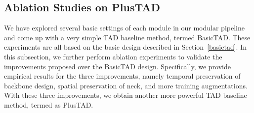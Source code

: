 \documentclass[a4paper,fleqn]{cas-dc}
\begin{document}
\begin{table*}[t]
\centering
\small
\caption{\textbf{Ablation study on improvements of PlusTAD on THUMOS14~\citep{THUMOS14}}. Temporal Preservation is for backbone design (indicated as ``TP''), and Spatial Preservation is for neck design (indicated as ``SP''). }
\label{table:xx}
\setlength{}
\end{table*}

\subsection{Ablation Studies on PlusTAD}
We have explored several basic settings of each module in our modular pipeline and come up with a very simple TAD baseline method, termed BasicTAD.
These experiments are all based on the basic design described in Section~\ref{basictad}.
In this subsection, we further perform ablation experiments to validate the improvements proposed over the BasicTAD design. Specifically, we provide empirical results for the three improvements, namely temporal preservation of backbone design, spatial preservation of neck, and more training augmentations. With these three improvements, we obtain another more powerful TAD baseline method, termed as PlusTAD.
\end{document}
